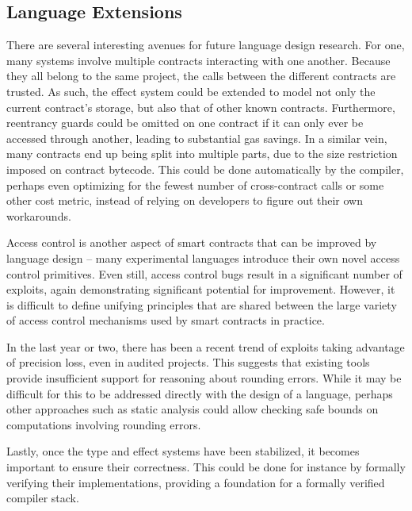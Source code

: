 \subsection{Language Extensions}
There are several interesting avenues for future language design research. For one, many systems involve multiple contracts interacting with one another. Because they all belong to the same project, the calls between the different contracts are trusted. As such, the effect system could be extended to model not only the current contract's storage, but also that of other known contracts. Furthermore, reentrancy guards could be omitted on one contract if it can only ever be accessed through another, leading to substantial gas savings. In a similar vein, many contracts end up being split into multiple parts, due to the size restriction imposed on contract bytecode. This could be done automatically by the compiler, perhaps even optimizing for the fewest number of cross-contract calls or some other cost metric, instead of relying on developers to figure out their own workarounds.
\par
Access control is another aspect of smart contracts that can be improved by language design -- many experimental languages introduce their own novel access control primitives. Even still, access control bugs result in a significant number of exploits, again demonstrating significant potential for improvement. However, it is difficult to define unifying principles that are shared between the large variety of access control mechanisms used by smart contracts in practice.
\par
In the last year or two, there has been a recent trend of exploits taking advantage of precision loss, even in audited projects. This suggests that existing tools provide insufficient support for reasoning about rounding errors. While it may be difficult for this to be addressed directly with the design of a language, perhaps other approaches such as static analysis could allow checking safe bounds on computations involving rounding errors.
\par
Lastly, once the type and effect systems have been stabilized, it becomes important to ensure their correctness. This could be done for instance by formally verifying their implementations, providing a foundation for a formally verified compiler stack.

